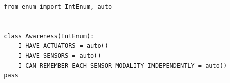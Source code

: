 \documentclass[a4paper]{article}
\title{}
\date{}
\begin{document}
    \maketitle
    \begin{verbatim}
        from enum import IntEnum, auto
    
    
        class Awareness(IntEnum):
            I_HAVE_ACTUATORS = auto()
            I_HAVE_SENSORS = auto()
            I_CAN_REMEMBER_EACH_SENSOR_MODALITY_INDEPENDENTLY = auto()
        pass
    \end{verbatim}
    
\end{document}
